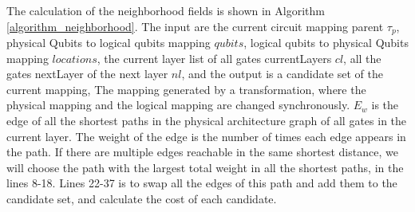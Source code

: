 \documentclass[runningheads]{llncs}
\begin{document}
The calculation of the neighborhood fields is shown in Algorithm \ref{algorithm_neighborhood}. 
The input are the current circuit mapping parent $\tau_{p}$, physical Qubits to logical qubits mapping $qubits$, 
logical qubits to physical Qubits mapping $locations$, the current layer list of all gates currentLayers $cl$, 
all the gates nextLayer of the next layer $nl$, and the output is a candidate set of the current mapping, 
The mapping generated by a transformation, where the physical mapping and the logical mapping 
are changed synchronously. $E_{w}$ is the edge of all the shortest paths in the physical architecture 
graph of all gates in the current layer. The weight of the edge is the number of times each edge appears 
in the path. If there are multiple edges reachable in the same shortest distance, 
we will choose the path with the largest total weight in all the shortest paths, 
in the lines 8-18.
Lines 22-37 is to swap all the edges of this path and add them to the candidate set, 
and calculate the cost of each candidate.
\end{document}
